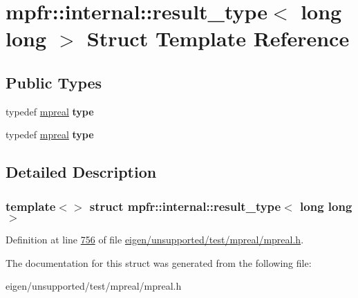 \hypertarget{structmpfr_1_1internal_1_1result__type_3_01long_01long_01_4}{}\section{mpfr\+:\+:internal\+:\+:result\+\_\+type$<$ long long $>$ Struct Template Reference}
\label{structmpfr_1_1internal_1_1result__type_3_01long_01long_01_4}
\subsection*{Public Types}
\begin{DoxyCompactItemize}
\item 
\mbox{\label{structmpfr_1_1internal_1_1result__type_3_01long_01long_01_4_a4421b197cd9c7a1a30ac0071b5182ca5}} 
typedef \hyperlink{classmpfr_1_1mpreal}{mpreal} {\bfseries type}
\item 
\mbox{\label{structmpfr_1_1internal_1_1result__type_3_01long_01long_01_4_a4421b197cd9c7a1a30ac0071b5182ca5}} 
typedef \hyperlink{classmpfr_1_1mpreal}{mpreal} {\bfseries type}
\end{DoxyCompactItemize}


\subsection{Detailed Description}
\subsubsection*{template$<$$>$\newline
struct mpfr\+::internal\+::result\+\_\+type$<$ long long $>$}



Definition at line \hyperlink{eigen_2unsupported_2test_2mpreal_2mpreal_8h_source_l00756}{756} of file \hyperlink{eigen_2unsupported_2test_2mpreal_2mpreal_8h_source}{eigen/unsupported/test/mpreal/mpreal.\+h}.



The documentation for this struct was generated from the following file\+:\begin{DoxyCompactItemize}
\item 
eigen/unsupported/test/mpreal/mpreal.\+h\end{DoxyCompactItemize}

